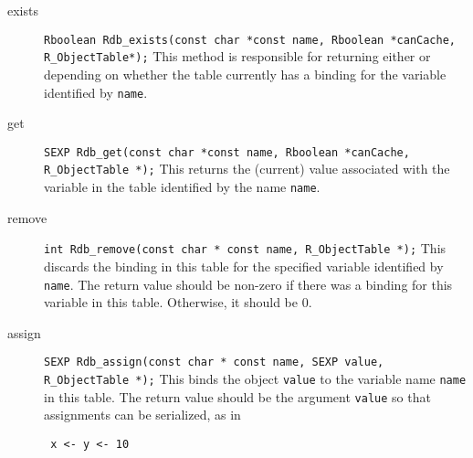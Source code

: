 \documentclass{article}
\begin{document}
\begin{description}
\item[exists]
{\small
\verb+Rboolean Rdb_exists(const char *const name, Rboolean *canCache, R_ObjectTable*);+
}
This method is responsible for returning
either \STrue{} or \SFalse{}
depending on whether the table currently has a binding for
the variable identified by \verb+name+.
\item[get]
{\small
\verb+SEXP Rdb_get(const char *const name, Rboolean *canCache, R_ObjectTable *);+
}
This returns the (current) value associated with the variable in the table
identified by the name \verb+name+.
\item[remove]
{\small
\verb+int Rdb_remove(const char * const name, R_ObjectTable *);+
}
This discards the binding in this table
for the specified variable identified by \verb+name+.
The return value should be
non-zero if there was a binding for this variable
in this table. Otherwise, it should be $0$.
\item[assign]
{\small
\verb+SEXP Rdb_assign(const char * const name, SEXP value, R_ObjectTable *);+
}
This binds the object \verb+value+ to
the variable name \verb+name+ in this table.
The return value should be the argument \verb+value+
so that assignments can be serialized, as in
\begin{verbatim}
 x <- y <- 10
\end{verbatim}


\end{description}
\end{document}
